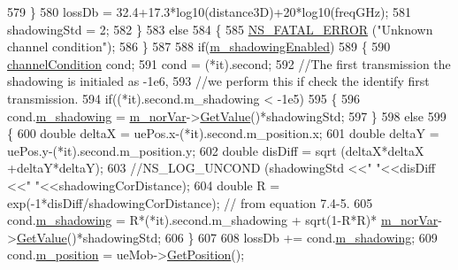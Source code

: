\begin{DoxyCode}
579                 \}
580                 lossDb = 32.4+17.3*log10(distance3D)+20*log10(freqGHz);
581                 shadowingStd = 2;
582         \}
583         \textcolor{keywordflow}{else}
584         \{
585                 \hyperlink{group__fatal_ga5131d5e3f75d7d4cbfd706ac456fdc85}{NS\_FATAL\_ERROR} (\textcolor{stringliteral}{"Unknown channel condition"});
586         \}
587 
588         \textcolor{keywordflow}{if}(\hyperlink{classMmWave3gppPropagationLossModel_ac5ba12ef57c52196b6434d801d2e22af}{m\_shadowingEnabled})
589         \{
590                 \hyperlink{structchannelCondition}{channelCondition} cond;
591                 cond = (*it).second;
592                 \textcolor{comment}{//The first transmission the shadowing is initialed as -1e6,}
593                 \textcolor{comment}{//we perform this if check the identify first  transmission.}
594                 \textcolor{keywordflow}{if}((*it).second.m\_shadowing < -1e5)
595                 \{
596                         cond.\hyperlink{structchannelCondition_abf42a510bc41e8eb84c96f9b47cc8f47}{m\_shadowing} = \hyperlink{classMmWave3gppPropagationLossModel_a513eea17719ec9c16c3f4e215b018ce9}{m\_norVar}->\hyperlink{classns3_1_1NormalRandomVariable_a0134d131477bc439cc6ff7cbe84b03a9}{GetValue}()*shadowingStd;
597                 \}
598                 \textcolor{keywordflow}{else}
599                 \{
600                         \textcolor{keywordtype}{double} deltaX = uePos.x-(*it).second.m\_position.x;
601                         \textcolor{keywordtype}{double} deltaY = uePos.y-(*it).second.m\_position.y;
602                         \textcolor{keywordtype}{double} disDiff = sqrt (deltaX*deltaX +deltaY*deltaY);
603                         \textcolor{comment}{//NS\_LOG\_UNCOND (shadowingStd <<"  "<<disDiff <<"  "<<shadowingCorDistance);}
604                         \textcolor{keywordtype}{double} R = exp(-1*disDiff/shadowingCorDistance); \textcolor{comment}{// from equation 7.4-5.}
605                         cond.\hyperlink{structchannelCondition_abf42a510bc41e8eb84c96f9b47cc8f47}{m\_shadowing} = R*(*it).second.m\_shadowing + sqrt(1-R*R)*
      \hyperlink{classMmWave3gppPropagationLossModel_a513eea17719ec9c16c3f4e215b018ce9}{m\_norVar}->\hyperlink{classns3_1_1NormalRandomVariable_a0134d131477bc439cc6ff7cbe84b03a9}{GetValue}()*shadowingStd;
606                 \}
607 
608                 lossDb += cond.\hyperlink{structchannelCondition_abf42a510bc41e8eb84c96f9b47cc8f47}{m\_shadowing};
609                 cond.\hyperlink{structchannelCondition_a24eb519106a6796f4f2bebcd9ea2fc40}{m\_position} = ueMob->\hyperlink{classns3_1_1MobilityModel_aba838f06ec5bbb2d193d94b8c0e4abb4}{GetPosition}();

\end{DoxyCode}
